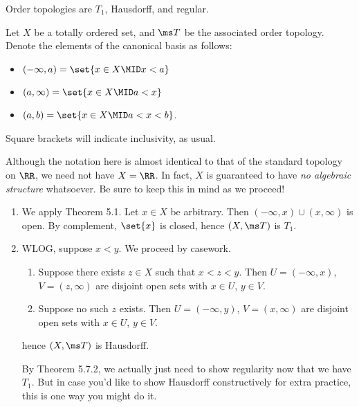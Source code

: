 \documentclass{fkpset}
\begin{document}
  \begin{problem}[5.15]
    Order topologies are $T_1$, Hausdorff, and regular.
  \end{problem}
  \begin{solution}
    Let $X$ be a totally ordered set, and $\ms T$ be the associated
    order topology. Denote the elements of the canonical basis as
    follows:
    \begin{itemize}
      \item $(-\infty, a) = \set{x \in X \MID x < a}$
      \item $(a, \infty) = \set{x \in X \MID a < x}$
      \item $(a,b) = \set{x \in X \MID a < x < b}$.
    \end{itemize}
    Square brackets will indicate inclusivity, as usual.
    \begin{note}
      \color{red} Although the notation here is almost identical to
      that of the standard topology on $\RR$, we need not have $X =
      \RR$. In fact, $X$ is guaranteed to have \emph{no algebraic
        structure} whatsoever. Be sure to keep this in mind as we
      proceed!
    \end{note}

    \begin{enumerate}[label=(\arabic*)]
      \item We apply Theorem 5.1. Let $x \in X$ be arbitrary. Then
        $(-\infty, x) \cup (x, \infty)$ is open. By complement,
        $\set{x}$ is closed, hence $(X,\ms T)$ is $T_1$.
      \item WLOG, suppose $x < y$. We proceed by casework.
        \begin{enumerate}[label=(\roman*)]
          \item Suppose there exists $z \in X$ such that $x < z < y$.
            Then $U = (-\infty, x)$, $V = (z, \infty)$ are disjoint
            open sets with $x \in U$, $y \in V$.
          \item Suppose no such $z$ exists. Then $U = (-\infty, y)$,
            $V = (x, \infty)$ are disjoint open sets with $x \in U$,
            $y \in V$.
        \end{enumerate}
        hence $(X, \ms T)$ is Hausdorff.
        \begin{remark}
          {\color{red} By Theorem 5.7.2, we actually just need to show
          regularity now that we have $T_1$. But in case you'd like to
          show Hausdorff constructively for extra practice, this is
          one way you might do it.

}
\end{remark}
\end{enumerate}
\end{solution}
\end{document}
